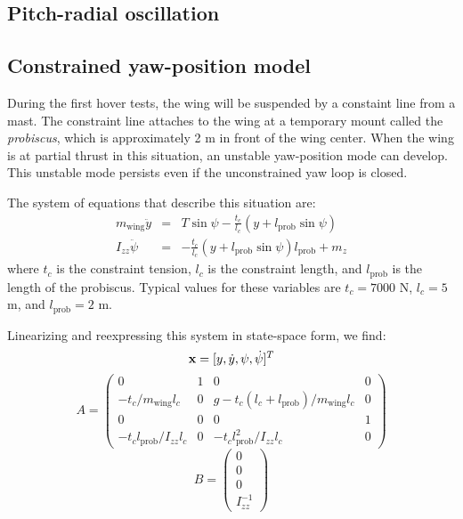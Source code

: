 \documentclass[11pt]{amsart}
\begin{document}
\subsection{Pitch-radial oscillation}




\subsection{Constrained yaw-position model}

During the first hover tests, the wing will be suspended by a
constaint line from a mast.  The constraint line attaches to the wing
at a temporary mount called the {\it probiscus}, which is
approximately 2 m in front of the wing center.  When the wing is at
partial thrust in this situation, an unstable yaw-position mode can
develop.  This unstable mode persists even if the unconstrained yaw
loop is closed.

The system of equations that describe this situation are:
\begin{eqnarray}
m_{\mathrm{wing}} \ddot{y} &=& T \sin \psi -
\frac{t_c}{l_c} (y + l_{\mathrm{prob}} \sin \psi) \\
I_{zz} \ddot{\psi} &=&
-\frac{t_c}{l_c} (y + l_{\mathrm{prob}} \sin \psi) l_{\mathrm{prob}} + m_z
\end{eqnarray}
where $t_c$ is the constraint tension, $l_c$ is the constraint length,
and $l_{\mathrm{prob}}$ is the length of the probiscus.  Typical
values for these variables are $t_c = 7000$ N, $l_c = 5$ m, and
$l_{\mathrm{prob}} = 2$ m.

Linearizing and reexpressing this system in state-space form, we find:
\begin{equation}
  \bold{x} = [y, \dot{y}, \psi, \dot{\psi}]^T
\end{equation}
\begin{equation}
A = \left(
\begin{array}{cccc}
   0 & 1 & 0 & 0 \\
   -t_c/m_{\mathrm{wing}} l_c &
   0 &
   g - t_c (l_c + l_{\mathrm{prob}}) / m_{\mathrm{wing}} l_c &
   0 \\
   0 & 0 & 0 & 1 \\
   -t_c l_{\mathrm{prob}} / I_{zz} l_c &
   0 &
   -t_c l^2_{\mathrm{prob}}/I_{zz} l_c  &
   0
\end{array}
\right)
\end{equation}
\begin{equation}
B = \left(
\begin{array}{c}
  0 \\
  0 \\
  0 \\
  I^{-1}_{zz}
\end{array}
\right)
\end{equation}
\end{document}
